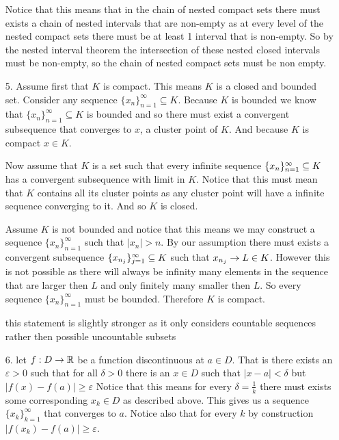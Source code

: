 \documentclass[12pt]{amsart}
\begin{document}
\begin{itemize}
        Notice that this means that in the chain of nested compact sets there must exists a
        chain of nested intervals that are non-empty as at every level of the nested
        compact sets there must be at least 1 interval that is non-empty. So by the
        nested interval theorem the intersection of these nested closed intervals must
        be non-empty, so the chain of nested compact sets must be non empty.

    \item[5.] Assume first that $K$ is compact. This means $K$ is a closed and bounded set.
        Consider any sequence $\{x_n\}_{n=1}^\infty\subseteq K$. Because $K$ is bounded we
        know that $\{x_n\}_{n=1}^\infty\subseteq K$ is bounded and so there must exist a
        convergent subsequence that converges to $x$, a cluster point of $K$. And
        because $K$ is compact $x\in K$.

        Now assume that $K$ is a set such that every infinite sequence
        $\{x_n\}_{n=1}^\infty\subseteq K$ has a convergent subsequence with limit in $K$.
        Notice that this must mean that $K$ contains all its cluster points as any
        cluster point will have a infinite sequence converging to it. And so $K$ is
        closed.

        Assume $K$ is not bounded and notice that this means we may construct a
        sequence $\{x_n\}_{n=1}^\infty$ such that $|x_n|>n$. By our assumption there
        must exists a convergent subsequence $\{x_{n_j}\}_{j=1}^\infty\subseteq K$ such that
        $x_{n_j}\rightarrow L\in K$. However this is not possible as there will always be
        infinity many elements in the sequence that are larger then $L$ and only
        finitely many smaller then $L$. So every sequence $\{x_n\}_{n=1}^\infty$ must
        be bounded. Therefore $K$ is compact.

        this statement is slightly stronger as it only considers countable sequences
        rather then possible uncountable subsets

    \item[6.] let $f:D\rightarrow\mathbb{R}$ be a function discontinuous at $a\in D$. That is there exists an
        $\varepsilon>0$ such that for all $\delta>0$ there is an $x\in D$ such that $|x-a|<\delta$
        but $|f(x)-f(a)|\geq \varepsilon$
        Notice that this means for every $\delta = \frac{1}{k}$ there must exists some corresponding
        $x_k\in D$ as described above.
        This gives us a sequence $\{x_k\}_{k=1}^\infty$ that converges to $a$. Notice also that for every
        $k$ by construction $|f(x_k)-f(a)|\geq \varepsilon$.


\end{itemize}
\end{document}

